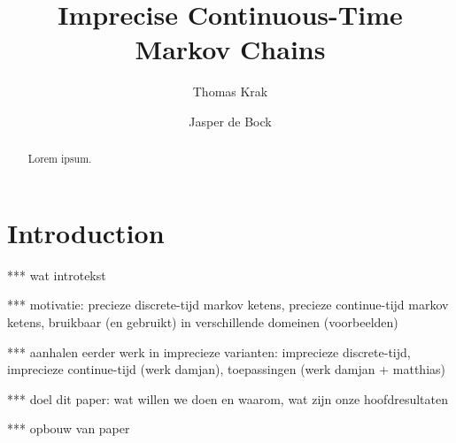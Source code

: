 \documentclass[10pt]{paper}
\title{Imprecise Continuous-Time Markov Chains}
\author{Thomas Krak \and Jasper de Bock}
\theoremstyle{definition}
\begin{document}


\date{}
\maketitle

\begin{abstract}
Lorem ipsum.
\end{abstract}

\section{Introduction}\label{sec:introduction}

*** wat introtekst

*** motivatie: precieze discrete-tijd markov ketens, precieze continue-tijd markov ketens, bruikbaar (en gebruikt) in verschillende domeinen (voorbeelden)

*** aanhalen eerder werk in imprecieze varianten: imprecieze discrete-tijd, imprecieze continue-tijd (werk damjan), toepassingen (werk damjan + matthias)

*** doel dit paper: wat willen we doen en waarom, wat zijn onze hoofdresultaten

*** opbouw van paper
\end{document}
